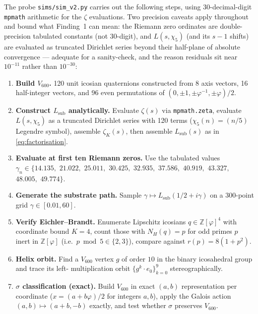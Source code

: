 \documentclass[11pt,a4paper]{article}
\newcommand{\Vsix}{V_{600}}
\newcommand{\NH}{N_H}
\newcommand{\Z}{\mathbb{Z}}
\newcommand{\Lsub}{L_{\mathrm{sub}}}
\begin{document}
The probe \texttt{sims/sim\_v2.py} carries out the following steps,
using 30-decimal-digit \texttt{mpmath} arithmetic for the $\zeta$
evaluations. Two precision caveats apply throughout and bound what
Finding~1 can mean: the Riemann zero ordinates are double-precision
tabulated constants (not 30-digit), and $L(s,\chi_5)$ (and its
$s{-}1$ shifts) are evaluated as truncated Dirichlet series beyond
their half-plane of absolute convergence --- adequate for a
sanity-check, and the reason residuals sit near $10^{-11}$ rather
than $10^{-30}$:

\begin{enumerate}[leftmargin=*]
  \item \textbf{Build $\Vsix$.} 120 unit icosian quaternions
        constructed from 8 axis vectors, 16 half-integer vectors,
        and 96 even permutations of $(0, \pm 1, \pm \varphi^{-1},
        \pm \varphi)/2$.
  \item \textbf{Construct $\Lsub$ analytically.} Evaluate
        $\zeta(s)$ via \texttt{mpmath.zeta}, evaluate
        $L(s, \chi_5)$ as a truncated Dirichlet series with 120
        terms ($\chi_5(n) = (n/5)$ Legendre symbol), assemble
        $\zeta_K(s)$, then assemble $\Lsub(s)$ as in
        \eqref{eq:factorisation}.
  \item \textbf{Evaluate at first ten Riemann zeros.} Use the
        tabulated values $\gamma_n \in \{14.135,$ $21.022,$
        $25.011,$ $30.425,$ $32.935,$ $37.586,$ $40.919,$
        $43.327,$ $48.005,$ $49.774\}$.
  \item \textbf{Generate the substrate path.} Sample
        $\gamma \mapsto \Lsub(1/2 + i\gamma)$ on a 300-point grid
        $\gamma \in [0.01, 60]$.
  \item \textbf{Verify Eichler--Brandt.} Enumerate Lipschitz
        icosians $q \in \Z[\varphi]^4$ with coordinate bound
        $K = 4$, count those with $\NH(q) = p$ for odd primes $p$
        inert in $\Z[\varphi]$ (i.e.\ $p \bmod 5 \in \{2, 3\}$),
        compare against $r(p) = 8(1 + p^2)$.
  \item \textbf{Helix orbit.} Find a $V_{600}$ vertex $g$ of order
        $10$ in the binary icosahedral group and trace its left-
        multiplication orbit $\{g^k \cdot e_0\}_{k=0}^9$
        stereographically.
  \item \textbf{$\sigma$ classification (exact).} Build $\Vsix$ in
        exact $(a, b)$ representation per coordinate
        ($x = (a + b\varphi)/2$ for integers $a, b$), apply the
        Galois action $(a, b) \mapsto (a + b, -b)$ exactly, and
        test whether $\sigma$ preserves $\Vsix$.
\end{enumerate}
\end{document}
